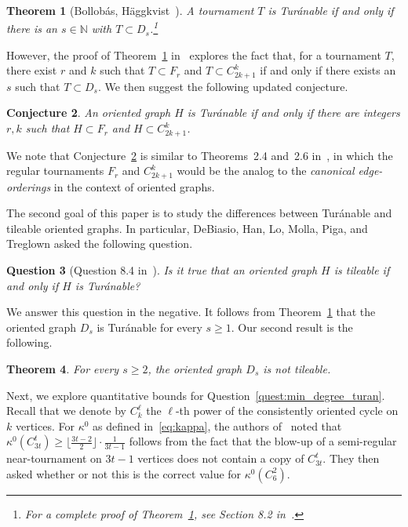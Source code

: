 \documentclass[11pt]{amsart}
\newtheorem{theorem}{Theorem}[section]
\newtheorem{question}[theorem]{Question}
\newtheorem{conjecture}[theorem]{Conjecture}
\def\N{\mathbb{N}}
\begin{document}
\begin{theorem}[Bollob\'as, H\"{a}ggkvist~\cite{bollobas}] \label{thm:bh}
    A tournament $T$ is Tur\'anable if and only if there is an $s \in \N$ with $T \subset D_s$.\footnote{For a complete proof of Theorem~\ref{thm:bh}, see Section 8.2 in~\cite{DHLMPT}.}
\end{theorem}

However, the proof of Theorem~\ref{thm:bh} in~\cite{bollobas} explores the fact that, for a tournament $T$, there exist $r$ and $k$ such that $T \subset F_r$ and $T \subset C_{2k+1}^k$ if and only if there exists an $s$ such that $T \subset D_s$. We then suggest the following updated conjecture.

\begin{conjecture} \label{new_conj}
    An oriented graph $H$ is Tur\'anable if and only if there are integers $r, k$ such that $H \subset F_r$ and $H \subset C_{2k+1}^k$.
\end{conjecture}

We note that Conjecture~\ref{new_conj} is similar to Theorems~2.4 and~2.6 in~\cite{APTX}, in which the regular tournaments $F_r$ and $C_{2k+1}^k$ would be the analog to the \emph{canonical edge-orderings} in the context of oriented graphs.

The second goal of this paper is to study the differences between Tur\'anable and tileable oriented graphs. In particular, DeBiasio, Han, Lo, Molla, Piga, and Treglown asked the following question.

\begin{question}[Question 8.4 in~\cite{DHLMPT}] \label{quest:dhlmpt} 
    Is it true that an oriented graph $H$ is tileable if and only if $H$ is Tur\'anable?
\end{question}

We answer this question in the negative. It follows from Theorem~\ref{thm:bh} that the oriented graph $D_s$ is Tur\'anable for every $s \ge 1$. Our second result is the following.

\begin{theorem}\label{thm:ds} 
    For every $s\ge 2$, the oriented graph $D_s$ is not tileable.
\end{theorem} 

Next, we explore quantitative bounds for Question~\ref{quest:min_degree_turan}. Recall that we denote by $C_{k}^\ell$ the $\ell$-th power of the consistently oriented cycle on $k$ vertices. For $\kappa^0$ as defined in~\eqref{eq:kappa}, the authors of~\cite{DHLMPT} noted that $\kappa^0(C_{3t}^t) \ge \lfloor \frac{3t-2}{2} \rfloor \cdot \frac{1}{3t-1}$ follows from the fact that the blow-up of a semi-regular near-tournament on $3t-1$ vertices does not contain a copy of $C_{3t}^t$. They then asked whether or not this is the correct value for $\kappa^0(C_6^2)$.
\end{document}
